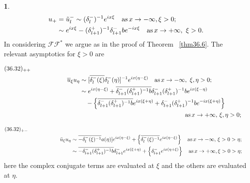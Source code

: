\documentclass{surv-l}
\theoremstyle{plain}
\theoremstyle{definition}
\newtheorem*{sop}{\sc{Sketch of Proof}}
\numberwithin{equation}{chapter}
\begin{document}
\begin{sop}
\begin{align}\label{eq36.31}
u_{+}&=\tilde{u}_{l}^-\sim(\delta_{l}^{-})^{-1}e^{ix\xi}\quad \mathrm{as}\,x\rightarrow-\infty,\xi>0;\\
&\sim e^{ix\xi}-(\delta_{l+1}^{+})^{-1}\delta_{l+1}^{-}be^{-ix\xi}\quad \mathrm{as}\,x\rightarrow +\infty,\ \xi>0.\notag
\end{align}
In considering $\mathscr{F}\!\!\mathscr{F}^{*}$ we argue as in the proof of Theorem ~\ref{thm36.6}. The relevant asymptotics for $\xi>0$ are

\begin{align*}
(36.32)_{++}\qquad\qquad\qquad\qquad\\
\overline{u}_{\xi}u_{\eta}&\sim[\overline{\delta_{l}^{-}(\xi)}\delta_{l}^{-}(\eta)]^{-1}e^{ix(\eta-\xi)}\quad\mathrm{as}\, x\rightarrow -\infty,\ \xi,\eta>0;\\ \notag
&\sim e^{ix(\eta-\xi)}+\overline{\delta_{l+1}^{-}(\delta_{l+1}^{+})^{-1}b}\delta_{l+1}^{-}(\delta_{l+1}^{+})^{-1}be^{ix(\xi-\eta)}\\\nonumber
&\quad-\left\{\overline{\delta_{l+1}^{-}(\delta_{l+1}^{+})^{-1}b}e^{ix(\xi+\eta)}+\delta_{l+1}^{-}(\delta_{l+1}^{+})^{-1}be^{-ix(\xi+\eta)}\right\}\\\nonumber
&\qquad\qquad\qquad\qquad\qquad\qquad\qquad\qquad\quad\,\mathrm{as}\,x\rightarrow +\infty,\,\xi,\eta>0;
\end{align*}

\begin{align*}
(36.32)_{+-}\qquad\qquad\qquad\qquad\\
\bar{u}_{\xi}u_{\eta}&\sim\overline{-\delta_{l}^{-}(\xi)^{-1}}a(\eta)]e^{ix(\eta-\xi)}+\left\{\overline{\delta_{l}^{-}(\xi)^{-1}}e^{ix(\eta-\xi)}\right\} \quad \mathrm{as}\,x\rightarrow-\infty,\,\xi>0>\eta;\\ &\sim\overline{-\delta_{l+1}^{-}(\delta_{l+1}^{+})^{-1}b}\delta_{l+1}^{-}e^{i x(\xi+\eta)}+\left\{\delta_{l+1}^{-}e^{ix(\eta+\xi)}\right\}\quad \mathrm{as}\,x\rightarrow +\infty,\xi>0>\eta;\notag
\end{align*}
here the complex conjugate terms are evaluated at $\xi$ and the others are evaluated at $\eta$.


\end{sop}
\end{document}

